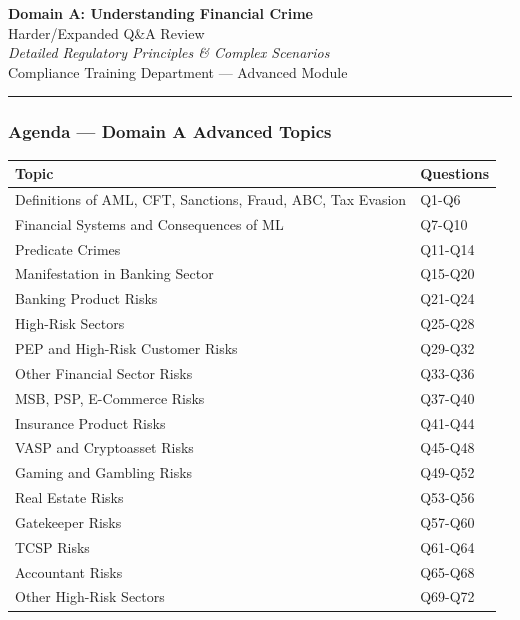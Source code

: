 \documentclass[12pt,aspectratio=169]{beamer}
\renewcommand{\scriptsize}{\fontsize{5}{6}\selectfont}
\newcommand{\keypoint}[1]{\textcolor{deepblue}{\textbf{#1}}}
\begin{document}
	
	\begin{frame}
		\centering
		\vspace{0.8cm}
		{\fontsize{16}{19}\selectfont \textbf{Domain A: Understanding Financial Crime}}\\[0.15cm]
		{\fontsize{12}{14}\selectfont Harder/Expanded Q\&A Review}\\[0.3cm]
		{\fontsize{9}{11}\selectfont \textit{Detailed Regulatory Principles \& Complex Scenarios}}\\[0.3cm]
		{\fontsize{8}{10}\selectfont Compliance Training Department — Advanced Module}
		\vspace{0.2cm}
		\rule{4cm}{0.5pt}
	\end{frame}
	
	\begin{frame}
		\frametitle{\fontsize{11}{13}\selectfont Agenda — Domain A Advanced Topics}
		\scriptsize
		\begin{longtable}{p{} p{0.50\textwidth}}
			\toprule
			\keypoint{Topic} & \keypoint{Questions} \\
			\midrule
			Definitions of AML, CFT, Sanctions, Fraud, ABC, Tax Evasion & Q1-Q6 \\
			Financial Systems and Consequences of ML & Q7-Q10 \\
			Predicate Crimes & Q11-Q14 \\
			Manifestation in Banking Sector & Q15-Q20 \\
			Banking Product Risks & Q21-Q24 \\
			High-Risk Sectors & Q25-Q28 \\
			PEP and High-Risk Customer Risks & Q29-Q32 \\
			Other Financial Sector Risks & Q33-Q36 \\
			MSB, PSP, E-Commerce Risks & Q37-Q40 \\
			Insurance Product Risks & Q41-Q44 \\
			VASP and Cryptoasset Risks & Q45-Q48 \\
			Gaming and Gambling Risks & Q49-Q52 \\
			Real Estate Risks & Q53-Q56 \\
			Gatekeeper Risks & Q57-Q60 \\
			TCSP Risks & Q61-Q64 \\
			Accountant Risks & Q65-Q68 \\
			Other High-Risk Sectors & Q69-Q72 \\
			\bottomrule
		\end{longtable}
	\end{frame}
	
\end{document}
